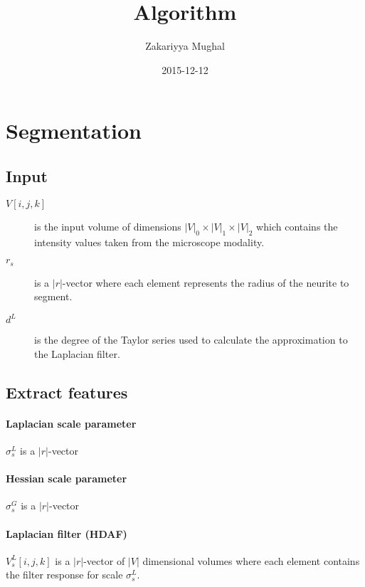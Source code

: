 \documentclass[12pt]{article}
\title{Algorithm}
\author{Zakariyya Mughal}
\date{2015-12-12}
\newcommand{\Dim}[1]{\ensuremath{\left|#1\right|}}
\newcommand{\InputVolumeIndices}{\ensuremath{[i,j,k]}}
\newcommand{\InputVolumeName}{\ensuremath{V}}
\newcommand{\InputVolume}{\ensuremath{\InputVolumeName\InputVolumeIndices}}
\newcommand{\InputVolumeDimensions}{\ensuremath{\Dim{\InputVolumeName}_0 \times \Dim{\InputVolumeName}_1 \times \Dim{\InputVolumeName}_2}}
\newcommand{\LaplacianFilterApproxDegree}{\ensuremath{d^{L}}}
\newcommand{\RadiiScalesName}{\ensuremath{r}}
\newcommand{\RadiiScales}{\ensuremath{\RadiiScalesName_{s}}}
\begin{document}
\maketitle
\tableofcontents

\section{Segmentation}

\subsection{Input}

\begin{description}
	\item[\InputVolume{}] is the input volume of dimensions
		\InputVolumeDimensions{} which contains the intensity values taken
		from the microscope modality.
	\item[\RadiiScales{}] is a \Dim{\RadiiScalesName}-vector where each element
		represents the radius of the neurite to segment.
	\item[\LaplacianFilterApproxDegree{}] is the degree of the
		Taylor series used to calculate the approximation
		to the Laplacian filter.
\end{description}

\subsection{Extract features}

\paragraph{Laplacian scale parameter}

\(\sigma^{L}_{s}\) is a \Dim{\RadiiScalesName}-vector

\paragraph{Hessian scale parameter}

\(\sigma^{G}_{s}\) is a \Dim{\RadiiScalesName}-vector

\paragraph{Laplacian filter (HDAF)}

\(V^{L}_{s}\InputVolumeIndices\) is a \Dim{\RadiiScalesName}-vector of
\Dim{\InputVolumeName} dimensional volumes where each element
contains the filter response for scale \(\sigma^{L}_{s}\).
\end{document}
